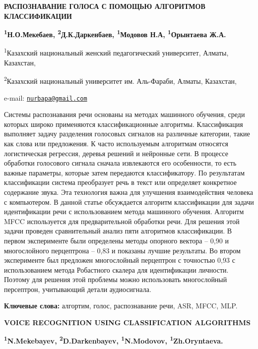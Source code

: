 \begin{articleheader}
{\bfseries РАСПОЗНАВАНИЕ ГОЛОСА С ПОМОЩЬЮ АЛГОРИТМОВ КЛАССИФИКАЦИИ}

{\bfseries
\textsuperscript{1}Н.О.Мекебаев\textsuperscript{\envelope },
\textsuperscript{2}Д.К.Даркенбаев,
\textsuperscript{1}Модовов Н.А,
\textsuperscript{1}Орынтаева Ж.А.}
\end{articleheader}

\begin{affiliation}
\textsuperscript{1}Казахский национальный женский педагогический университет, Алматы, Казахстан,

\textsuperscript{2}Казахский национальный университет им. Аль-Фараби, Алматы, Казахстан,

e-mail: \href{mailto:nurbapa@gmail.com}{\nolinkurl{nurbapa@gmail.com}}
\end{affiliation}

Системы распознавания речи основаны на методах машинного обучения, среди
которых широко применяются классификационные алгоритмы. Классификация
выполняет задачу разделения голосовых сигналов на различные категории,
такие как слова или предложения. К часто используемым алгоритмам
относятся логистическая регрессия, деревья решений и нейронные сети. В
процессе обработки голосового сигнала сначала извлекаются его
особенности, то есть важные параметры, которые затем передаются
классификатору. По результатам классификации система преобразует речь в
текст или определяет конкретное содержание звука. Эта технология важна
для улучшения взаимодействия человека с компьютером. В данной статье
обсуждается алгоритм классификации для задачи идентификации речи с
использованием метода машинного обучения. Алгоритм MFCC используется для
предварительной обработки речи. Для решения этой задачи проведен
сравнительный анализ пяти алгоритмов классификации. В первом
эксперименте были определены методы опорного вектора -- 0,90 и
многослойного перцептрона -- 0,83 и показаны лучшие результаты. Во
втором эксперименте был предложен многослойный перцептрон с точностью
0,93 с использованием метода Робастного скалера для идентификации
личности. Поэтому для решения этой проблемы можно использовать
многослойный персептрон, учитывающий детали аудиосигнала.

{\bfseries Ключевые слова:} алгортим, голос, распознавание речи, ASR, MFCC,
MLP.

\begin{articleheader}
{\bfseries VOICE RECOGNITION USING CLASSIFICATION ALGORITHMS}

{\bfseries
\textsuperscript{1}N.Mekebayev\textsuperscript{\envelope },
\textsuperscript{2}D.Darkenbayev,
\textsuperscript{1}N.Modovov,
\textsuperscript{1}Zh.Oryntaeva.}
\end{articleheader}

